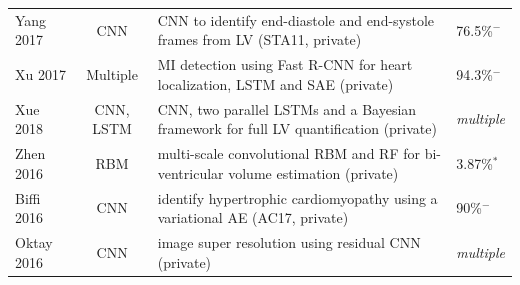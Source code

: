 \documentclass[journal]{IEEEtran}
\begin{document}
\begin{table}[!t]
\begin{minipage}{\textwidth}
\begin{tabularx}{\textwidth}{l c l l}
			Yang 2017\cite{yang2017convolutional}      & CNN            & CNN to identify end-diastole and end-systole frames from LV (STA11, private)              & 76.5\%$^-$                                                                                                                                                                                                                                     \\
			Xu 2017\cite{xu2017direct}                 & Multiple       & MI detection using Fast R-CNN for heart localization, LSTM and SAE (private)              & 94.3\%$^-$                                                                                                                                                                                                                                     \\
			Xue 2018\cite{xue2018full}                 & CNN, LSTM      & CNN, two parallel LSTMs and a Bayesian framework for full LV quantification (private)     & \textit{multiple}                                                                                                                                                                                                                                       \\
			Zhen 2016\cite{zhen2016multi}              & RBM            & multi-scale convolutional RBM and RF for bi-ventricular volume estimation (private)       & 3.87\%$^*$                                                                                                                                                                                                                                     \\
			Biffi 2016\cite{biffi2018learning}         & CNN            & identify hypertrophic cardiomyopathy using a variational AE (AC17, private)               & 90\%$^-$                                                                                                                                                                                                                                       \\
			Oktay 2016\cite{oktay2016multi}            & CNN            & image super resolution using residual CNN (private)                                       & \textit{multiple}                                                                                                                                                                                                                                       \\
			\bottomrule
		\end{tabularx}
	\end{minipage}
\end{table}
\end{document}
